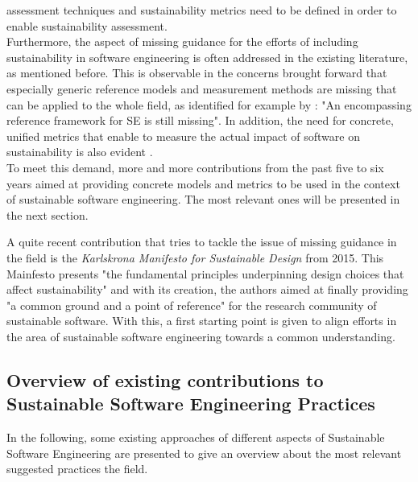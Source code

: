\documentclass[oribibl]{llncs}
\begin{document}
assessment techniques and sustainability metrics need to be defined in order to enable sustainability assessment.\\ %
Furthermore, the aspect of missing guidance for the efforts of including sustainability in software engineering is often addressed in the existing literature, as mentioned before. %
This is observable in the concerns brought forward that especially generic reference models and measurement methods are missing that can be applied to the whole field, as identified for example by \cite{penzenstadler_sustainability_2012}: "An encompassing reference framework for SE is still missing". %
In addition, the need for concrete, unified metrics that enable to measure the actual impact of software on sustainability is also evident %
.\\
To meet %
this demand, more and more contributions from the past five to six years aimed at providing concrete models and metrics to be used in the context of sustainable software engineering. The most relevant ones will be presented in the next section.


A quite recent contribution that tries to tackle the issue of missing guidance in the field is the \textit{Karlskrona Manifesto for Sustainable Design} \cite{karlskrona} from 2015. This Mainfesto presents "the fundamental principles underpinning design choices that affect sustainability" \cite{becker_sustainability_2015} 
and with its creation, the authors aimed at finally providing "a common ground and a point of reference"\cite{becker_sustainability_2015} for the research community of sustainable software. With this, a first starting point is given to align efforts in the area of sustainable software engineering towards a common understanding.   

\subsection{Overview of existing contributions to Sustainable Software Engineering Practices}%
In the following, some existing approaches of different aspects of Sustainable Software Engineering are presented to give an overview about the most relevant suggested practices the field. %
\end{document}
